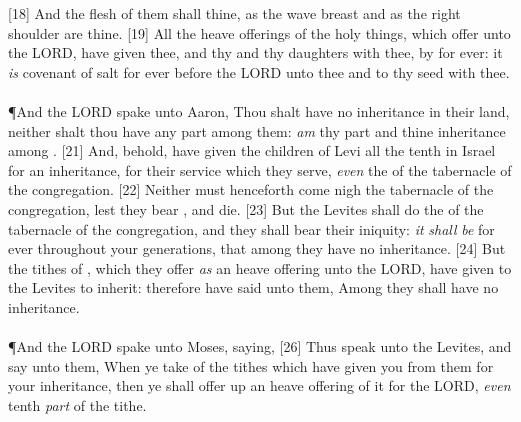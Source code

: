 [18] \textcolor[cmyk]{0.99998,1,0,0}{And the flesh of them shall  thine, as the wave breast and as the right shoulder are thine.}
[19] \textcolor[cmyk]{0.99998,1,0,0}{All the heave offerings of the holy things, which  offer unto the LORD, have  given thee, and thy  and thy daughters with thee, by   for ever: it \emph{is}  covenant of salt for ever before the LORD unto thee and to thy seed with thee.}\\
\\
\P \textcolor[cmyk]{0.99998,1,0,0}{And the LORD spake unto Aaron, Thou shalt have no inheritance in their land, neither shalt thou have any part among them:  \emph{am} thy part and thine inheritance among .}
[21] \textcolor[cmyk]{0.99998,1,0,0}{And, behold,  have given the children of Levi all the tenth in Israel for an inheritance, for their service which they serve, \emph{even} the  of the tabernacle of the congregation.}
[22] \textcolor[cmyk]{0.99998,1,0,0}{Neither must  henceforth come nigh the tabernacle of the congregation, lest they bear , and die.}
[23] \textcolor[cmyk]{0.99998,1,0,0}{But the Levites shall do the  of the tabernacle of the congregation, and they shall bear their iniquity: \emph{it} \emph{shall} \emph{be}   for ever throughout your generations, that among  they have no inheritance.}
[24] \textcolor[cmyk]{0.99998,1,0,0}{But the tithes of , which they offer \emph{as} an heave offering unto the LORD,  have given to the Levites to inherit: therefore  have said unto them, Among  they shall have no inheritance.}\\
\\
\P \textcolor[cmyk]{0.99998,1,0,0}{And the LORD spake unto Moses, saying,}
[26] \textcolor[cmyk]{0.99998,1,0,0}{Thus speak unto the Levites, and say unto them, When ye take of  the tithes which  have given you from them for your inheritance, then ye shall offer up an heave offering of it for the LORD, \emph{even}  tenth \emph{part} of the tithe.}
